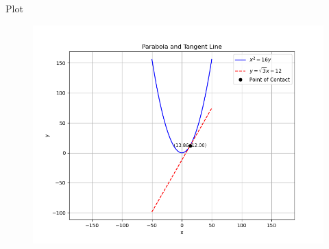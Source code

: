 \documentclass{beamer}
\begin{document}
\begin{frame}{Plot}
\begin{figure}[h!]
    \centering
    \includegraphics[height=0.5\textheight, keepaspectratio]{figs/Figure_1.png}
    \label{figure_1}
\end{figure}
\end{frame}
\end{document}
